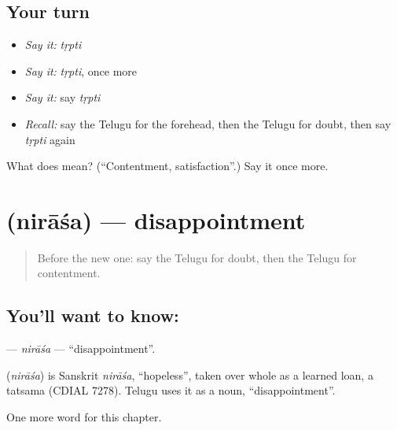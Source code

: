 \subsection*{Your turn}
\begin{itemize}
\raggedright
  \item \emph{Say it:} \emph{tṛpti}
  \item \emph{Say it:} \emph{tṛpti}, once more
  \item \emph{Say it:} say \emph{tṛpti}
  \item \emph{Recall:} say the Telugu for the forehead, then the Telugu for doubt, then say \emph{tṛpti} again
\end{itemize}

\begin{tcolorbox}[breakable,colback=teal!4,colframe=teal!35!black,title={Before you move on}]
What does  mean? (\textquotedblleft{}Contentment, satisfaction\textquotedblright{}.) Say it once more.
\end{tcolorbox}
\section[\texorpdfstring{\te{నిరాశ} (nirāśa)}{నిరాశ (nirāśa)}]{ (nirāśa) — disappointment}

\label{lesson:TE-C210-nirasa}



\begin{quote}
Before the new one: say the Telugu for doubt, then the Telugu for contentment.
\end{quote}

\subsection*{You'll want to know: }
\textbf{} — \emph{nirāśa} — \textquotedblleft{}disappointment\textquotedblright{}.

\begin{cousinweb}
\textbf{} (\emph{nirāśa}) is Sanskrit \emph{nirāśa}, \textquotedblleft{}hopeless\textquotedblright{}, taken over whole as a learned loan, a tatsama (CDIAL 7278). Telugu uses it as a noun, \textquotedblleft{}disappointment\textquotedblright{}.
\end{cousinweb}

\begin{grammarlens}[title={What you've built}]
One more word for this chapter.
\end{grammarlens}

